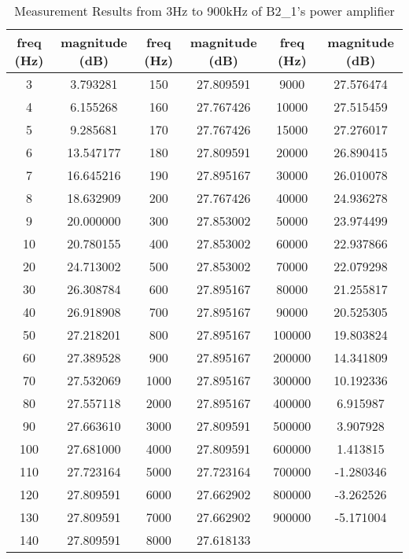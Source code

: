 \begin{table}[H] %
\centering
\caption{Measurement Results from 3Hz to 900kHz of B2\_1's power amplifier}
\label{tab:measurement_results}
\begin{tabular}{|c|c||c|c||c|c|}
\hline
freq (Hz) & magnitude (dB) & freq (Hz) & magnitude (dB) & freq (Hz) & magnitude (dB) \\\hline
3 & 3.793281 & 150 & 27.809591 & 9000 & 27.576474 \\\hline
4 & 6.155268 & 160 & 27.767426 & 10000 & 27.515459 \\\hline
5 & 9.285681 & 170 & 27.767426 & 15000 & 27.276017 \\\hline
6 & 13.547177 & 180 & 27.809591 & 20000 & 26.890415 \\\hline
7 & 16.645216 & 190 & 27.895167 & 30000 & 26.010078 \\\hline
8 & 18.632909 & 200 & 27.767426 & 40000 & 24.936278 \\\hline
9 & 20.000000 & 300 & 27.853002 & 50000 & 23.974499 \\\hline
10 & 20.780155 & 400 & 27.853002 & 60000 & 22.937866 \\\hline
20 & 24.713002 & 500 & 27.853002 & 70000 & 22.079298 \\\hline
30 & 26.308784 & 600 & 27.895167 & 80000 & 21.255817 \\\hline
40 & 26.918908 & 700 & 27.895167 & 90000 & 20.525305 \\\hline
50 & 27.218201 & 800 & 27.895167 & 100000 & 19.803824 \\\hline
60 & 27.389528 & 900 & 27.895167 & 200000 & 14.341809 \\\hline
70 & 27.532069 & 1000 & 27.895167 & 300000 & 10.192336 \\\hline
80 & 27.557118 & 2000 & 27.895167 & 400000 & 6.915987 \\\hline
90 & 27.663610 & 3000 & 27.809591 & 500000 & 3.907928 \\\hline
100 & 27.681000 & 4000 & 27.809591 & 600000 & 1.413815 \\\hline
110 & 27.723164 & 5000 & 27.723164 & 700000 & -1.280346 \\\hline
120 & 27.809591 & 6000 & 27.662902 & 800000 & -3.262526 \\\hline
130 & 27.809591 & 7000 & 27.662902 & 900000 & -5.171004 \\\hline
140 & 27.809591 & 8000 & 27.618133 &  &  \\\hline
\end{tabular}
\end{table}